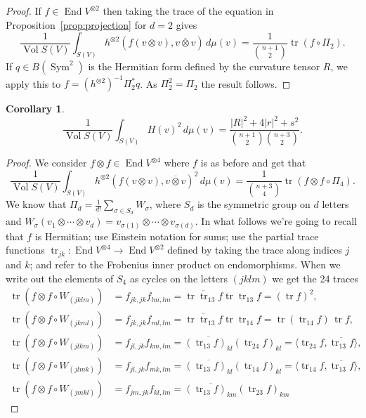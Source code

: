 \documentclass[10pt,a4paper]{amsart}
\newtheorem{coro}[theo]{Corollary}
\theoremstyle{definition}
\def\ov#1{\overline{#1}}
\def\d{\,d}
\DeclareMathOperator{\Sym}{Sym}
\DeclareMathOperator{\tr}{tr}
\DeclareMathOperator{\Vol}{Vol}
\DeclareMathOperator{\End}{End}
\begin{document}
\begin{proof}
If $f \in \End V^{\otimes 2}$ then taking the trace of the
equation in Proposition~\ref{prop:projection} for $d = 2$ gives
$$
\frac{1}{\Vol S(V)}
\int_{S(V)}
\!\!\!
h^{\otimes 2}(f(v \otimes v), \ov{v \otimes v}) \d\mu(v)
= \frac{1}{\binom{n+1}{2}} \tr(f \circ \Pi_2).
$$
If $q \in B(\Sym^2)$ is the Hermitian form defined by the curvature tensor $R$,
we apply this to $f = (h^{\otimes 2})^{-1} \Pi_2^* q$.
As $\Pi_2^2 = \Pi_2$ the result follows.
\end{proof}


\begin{coro}
$$
\frac{1}{\Vol S(V)} \int_{S(V)}
\!\!\!
H(v)^2  \d\mu(v)
= \frac{|R|^2 + 4|r|^2 + s^2}{\binom{n+1}{2} \binom{n+3}2}.
$$
\end{coro}

\begin{proof}
We consider $f \otimes f \in \End V^{\otimes 4}$ where
$f$ is as before and get that
$$
\frac{1}{\Vol S(V)}
\int_{S(V)}
\!\!\!
h^{\otimes 2}(f(v \otimes v), \ov{v \otimes v})^2 \d\mu(v)
= \frac{1}{\binom{n+3}{4}}
\tr (f \otimes f \circ \Pi_4).
$$
We know that $\Pi_d = \frac{1}{d!}\sum_{\sigma \in S_d} W_\sigma$, where $S_d$ is the
symmetric group on $d$ letters and $W_\sigma(v_1 \otimes \cdots \otimes v_d) =
v_{\sigma(1)} \otimes \cdots \otimes v_{\sigma(d)}$.
In what follows we're going to recall that $f$ is Hermitian;
use Einstein notation for sums;
use the partial trace
functions $\tr_{jk} : \End V^{\otimes 4} \to \End V^{\otimes 2}$ defined by
taking the trace along indices $j$ and $k$;
and refer to the Frobenius inner product on endomorphisms.
When we write out the elements of $S_4$ as cycles on the letters $(jklm)$
we get the 24 traces
\begin{align*}
\tr(f \otimes f \circ W_{(jklm)})
&= f_{jk,jk} f_{lm,lm}
= \ov{\tr \tr_{13} f} \tr \tr_{13} f
= (\tr f)^2,
\\
\tr(f \otimes f \circ W_{(jkml)})
&= f_{jk,jk} f_{ml,lm}
= \ov{\tr \tr_{13} f} \tr \tr_{14} f
= \tr(\tr_{14} f) \, \tr f,
\\
\tr(f \otimes f \circ W_{(jlkm)})
&= f_{jl,jk} f_{km,lm}
= \ov{(\tr_{13} f)_{kl}} (\tr_{24} f)_{kl}
= \langle \tr_{24} f, \ov{\tr_{13} f} \rangle,
\\
\tr(f \otimes f \circ W_{(jlmk)})
&= f_{jl,jk} f_{mk,lm}
= \ov{(\tr_{13} f)_{kl}} (\tr_{14} f)_{kl}
= \langle \tr_{14} f, \ov{\tr_{13} f} \rangle,
\\
\tr(f \otimes f \circ W_{(jmkl)})
&= f_{jm,jk} f_{kl,lm}
= \ov{(\tr_{13} f)_{km}} (\tr_{23} f)_{km}

\end{align*}
\end{proof}
\end{document}
